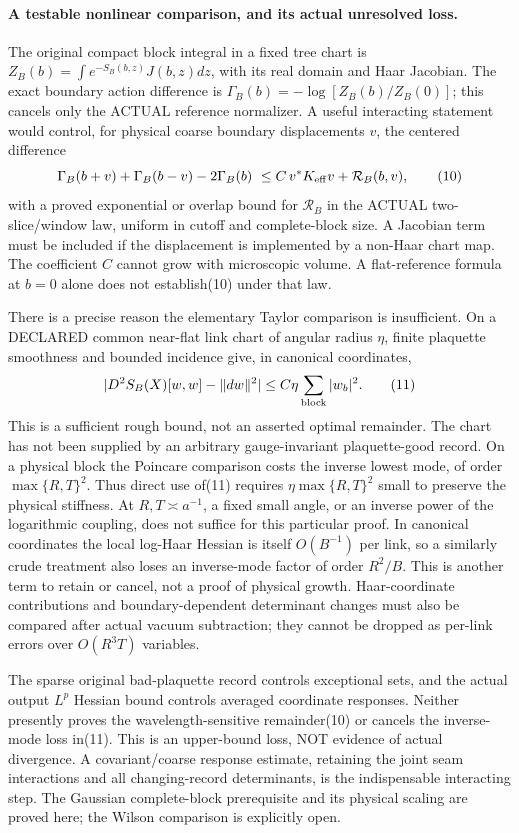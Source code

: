 \documentclass[11pt]{article}
\begin{document}
\paragraph{A testable nonlinear comparison, and its actual unresolved loss.}
The original compact block integral in a fixed tree chart is
$Z_B(b)=\int e^{-S_B(b,z)}J(b,z)dz$, with its real domain and Haar Jacobian.
The exact boundary action difference is
$\Gamma_B(b)=-\log[Z_B(b)/Z_B(0)]$; this cancels only the ACTUAL reference
normalizer. A useful interacting statement would control, for physical coarse
boundary displacements $v$, the centered difference
\[
 \Gamma_B(b+v)+\Gamma_B(b-v)-2\Gamma_B(b)
 \ \le C\,v^*K_{\rm eff}v+\mathcal R_B(b,v),                            \tag{10}
\]
with a proved exponential or overlap bound for $\mathcal R_B$ in the ACTUAL
two-slice/window law, uniform in cutoff and complete-block size. A Jacobian
term must be included if the displacement is implemented by a non-Haar chart
map. The coefficient $C$ cannot grow with microscopic volume. A flat-reference
formula at $b=0$ alone does not establish(10) under that law.

There is a precise reason the elementary Taylor comparison is insufficient.
On a DECLARED common near-flat link chart of angular radius $\eta$, finite
plaquette smoothness and bounded incidence give, in canonical coordinates,
\[
 |D^2S_B(X)[w,w]-\|dw\|^2|\le C\eta\sum_{\rm block}|w_b|^2.             \tag{11}
\]
This is a sufficient rough bound, not an asserted optimal remainder. The chart
has not been supplied by an arbitrary gauge-invariant plaquette-good record.
On a physical block the Poincare comparison costs the inverse lowest mode,
of order $\max\{R,T\}^2$. Thus direct use of(11) requires
$\eta\max\{R,T\}^2$ small to preserve the physical stiffness. At
$R,T\asymp a^{-1}$, a fixed small angle, or an inverse power of the
logarithmic coupling, does not suffice for this particular proof.
In canonical coordinates the local log-Haar Hessian is itself $O(B^{-1})$
per link, so a similarly crude treatment also loses an inverse-mode factor
of order $R^2/B$. This is another term to retain or cancel, not a proof of
physical growth. Haar-coordinate contributions and boundary-dependent determinant changes must
also be compared after actual vacuum subtraction; they cannot be dropped as
per-link errors over $O(R^3T)$ variables.

The sparse original bad-plaquette record controls exceptional sets, and the
actual output $L^p$ Hessian bound controls averaged coordinate responses.
Neither presently proves the wavelength-sensitive remainder(10) or cancels
the inverse-mode loss in(11). This is an upper-bound loss, NOT evidence of
actual divergence. A covariant/coarse response estimate, retaining the joint
seam interactions and all changing-record determinants, is the indispensable
interacting step. The Gaussian complete-block prerequisite and its physical
scaling are proved here; the Wilson comparison is explicitly open.
\end{document}
